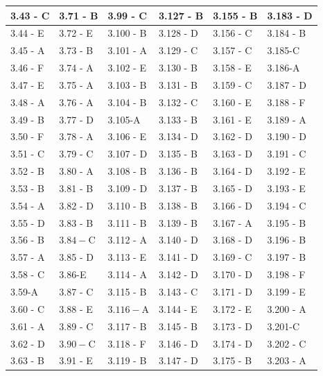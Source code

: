 \documentclass[10pt]{article}
\begin{document}
\begin{center}
\begin{tabular}{|l|l|l|l|l|l|}
\hline
3.43 - C & 3.71 - B & 3.99 - C & 3.127 - B & 3.155 - B & 3.183 - D \\
\hline
3.44 - E & 3.72 - E & 3.100 - B & 3.128 - D & 3.156 - C & 3.184 - B \\
\hline
3.45 - A & 3.73 - B & 3.101 - A & 3.129 - C & 3.157 - C & 3.185-C \\
\hline
3.46 - F & 3.74 - A & 3.102 - E & 3.130 - B & 3.158 - E & 3.186-A \\
\hline
3.47 - E & 3.75 - A & 3.103 - B & 3.131 - B & 3.159 - C & 3.187 - D \\
\hline
3.48 - A & 3.76 - A & 3.104 - B & 3.132 - C & 3.160 - E & 3.188 - F \\
\hline
3.49 - B & 3.77 - D & 3.105-A & 3.133 - B & 3.161 - E & 3.189 - A \\
\hline
3.50 - F & 3.78 - A & 3.106 - E & 3.134 - D & 3.162 - D & 3.190 - D \\
\hline
3.51 - C & 3.79 - C & 3.107 - D & 3.135 - B & 3.163 - D & 3.191 - C \\
\hline
3.52 - B & 3.80 - A & 3.108 - B & 3.136 - B & 3.164 - D & 3.192 - E \\
\hline
3.53 - B & 3.81 - B & 3.109 - D & 3.137 - B & 3.165 - D & 3.193 - E \\
\hline
3.54 - A & 3.82 - D & 3.110 - B & 3.138 - B & 3.166 - D & 3.194 - C \\
\hline
3.55 - D & 3.83 - B & 3.111 - B & 3.139 - B & 3.167 - A & 3.195 - B \\
\hline
3.56 - B & $3.84-\mathrm{C}$ & 3.112 - A & 3.140 - D & 3.168 - D & 3.196 - B \\
\hline
3.57 - A & 3.85 - D & 3.113 - E & 3.141 - D & 3.169 - C & 3.197 - B \\
\hline
3.58 - C & 3.86-E & 3.114 - A & 3.142 - D & 3.170 - D & 3.198 - F \\
\hline
3.59-A & 3.87 - C & 3.115 - B & 3.143 - C & 3.171 - D & 3.199 - E \\
\hline
3.60 - C & 3.88 - E & $3.116-\mathrm{A}$ & 3.144 - E & 3.172 - E & 3.200 - A \\
\hline
3.61 - A & 3.89 - C & 3.117 - B & 3.145 - B & 3.173 - D & 3.201-C \\
\hline
3.62 - D & $3.90-\mathrm{C}$ & 3.118 - F & 3.146 - D & 3.174 - D & 3.202 - C \\
\hline
3.63 - B & 3.91 - E & 3.119 - B & 3.147 - D & 3.175 - B & 3.203 - A \\

\end{tabular}
\end{center}
\end{document}
